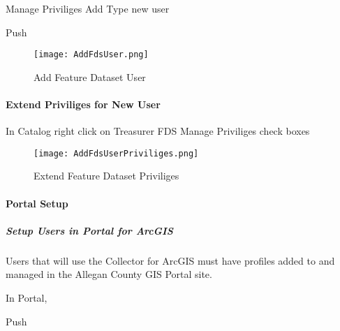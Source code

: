  {\rtArrow} Manage { \rtArrow} Priviliges { \rtArrow} Add { \rtArrow} Type new user { \rtArrow}

\vspace{.25in}

{\btn Push }
 \vspace{.25in}

 \begin{figure}[h!]
 \centering
     \texttt{[image: AddFdsUser.png]}
 \caption{Add Feature Dataset User}
 \end{figure}
 \clearpage
 \paragraph[Extend Priviliges for New User]{\Large Extend Priviliges for New User\texorpdfstring{\\}{}}
 \vspace{.5in}

 In Catalog {\rtArrow} right click on Treasurer FDS {\rtArrow} Manage {\rtArrow} Priviliges {\rtArrow} check boxes
 \vspace{.5in}

 \begin{figure}[h!]
 \centering
     \texttt{[image: AddFdsUserPriviliges.png]}
 \caption{Extend Feature Dataset Priviliges}
 \end{figure}
 \clearpage
\paragraph{Portal Setup}
 
\subparagraph{Setup Users in Portal for ArcGIS}
 \vspace{.5in}

 \noindent Users that will use the Collector for ArcGIS must have profiles added to and managed in the Allegan County GIS Portal site.
 \vspace{.5in}

 In Portal, {\rtArrow} 

\vspace{.2in}

{\btn Push }

